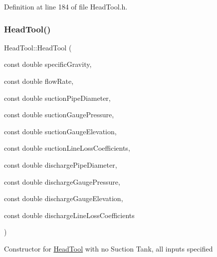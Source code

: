 Definition at line 184 of file Head\+Tool.\+h.

\mbox{\label{class_head_tool_a9934c87c8f8eb515ff32e46c74004c0e}} 
\subsubsection{\texorpdfstring{Head\+Tool()}{HeadTool()}\hspace{0.1cm}{\footnotesize\ttfamily [2/3]}}
{\footnotesize\ttfamily Head\+Tool\+::\+Head\+Tool (\begin{DoxyParamCaption}\item[{const double}]{specific\+Gravity,  }\item[{const double}]{flow\+Rate,  }\item[{const double}]{suction\+Pipe\+Diameter,  }\item[{const double}]{suction\+Gauge\+Pressure,  }\item[{const double}]{suction\+Gauge\+Elevation,  }\item[{const double}]{suction\+Line\+Loss\+Coefficients,  }\item[{const double}]{discharge\+Pipe\+Diameter,  }\item[{const double}]{discharge\+Gauge\+Pressure,  }\item[{const double}]{discharge\+Gauge\+Elevation,  }\item[{const double}]{discharge\+Line\+Loss\+Coefficients }\end{DoxyParamCaption})\hspace{0.3cm}{\ttfamily [inline]}}

Constructor for \hyperlink{class_head_tool}{Head\+Tool} with no Suction Tank, all inputs specified


